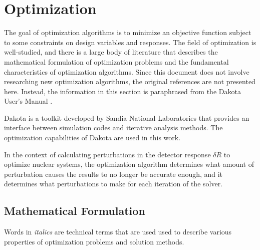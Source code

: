 \section{Optimization}
\label{sec:bg:opt}

The goal of optimization algorithms is to minimize an objective function subject to some constraints on design variables and responses.
The field of optimization is well-studied, and there is a large body of literature that describes the mathematical formulation of optimization problems and the fundamental characteristics of optimization algorithms.
Since this document does not involve researching new optimization algorithms, the original references are not presented here.
Instead, the information in this section is paraphrased from the Dakota User's Manual \cite{dakota}.

Dakota is a toolkit developed by Sandia National Laboratories that provides an interface between simulation codes and iterative analysis methods.
The optimization capabilities of Dakota are used in this work.

In the context of calculating perturbations in the detector response $\delta R$ to optimize nuclear systems, the optimization algorithm determines what amount of perturbation causes the results to no longer be accurate enough, and it determines what perturbations to make for each iteration of the solver.

\subsection{Mathematical Formulation}
\label{sec:bg:opt:math}

Words in \textit{italics} are technical terms that are used used to describe various properties of optimization problems and solution methods.


